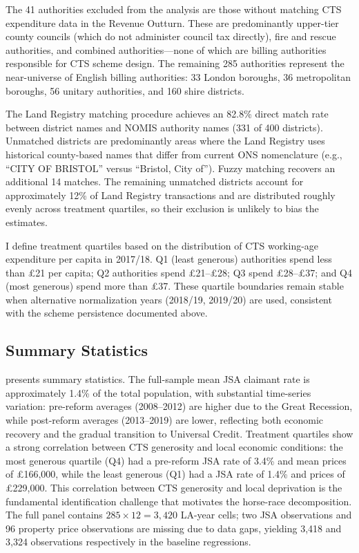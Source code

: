\documentclass[12pt]{article}
\begin{document}
The 41 authorities excluded from the analysis are those without matching CTS expenditure data in the Revenue Outturn. These are predominantly upper-tier county councils (which do not administer council tax directly), fire and rescue authorities, and combined authorities---none of which are billing authorities responsible for CTS scheme design. The remaining 285 authorities represent the near-universe of English billing authorities: 33 London boroughs, 36 metropolitan boroughs, 56 unitary authorities, and 160 shire districts.

The Land Registry matching procedure achieves an 82.8\% direct match rate between district names and NOMIS authority names (331 of 400 districts). Unmatched districts are predominantly areas where the Land Registry uses historical county-based names that differ from current ONS nomenclature (e.g., ``CITY OF BRISTOL'' versus ``Bristol, City of''). Fuzzy matching recovers an additional 14 matches. The remaining unmatched districts account for approximately 12\% of Land Registry transactions and are distributed roughly evenly across treatment quartiles, so their exclusion is unlikely to bias the estimates.

I define treatment quartiles based on the distribution of CTS working-age expenditure per capita in 2017/18. Q1 (least generous) authorities spend less than \pounds21 per capita; Q2 authorities spend \pounds21--\pounds28; Q3 spend \pounds28--\pounds37; and Q4 (most generous) spend more than \pounds37. These quartile boundaries remain stable when alternative normalization years (2018/19, 2019/20) are used, consistent with the scheme persistence documented above.

\subsection{Summary Statistics}



 presents summary statistics. The full-sample mean JSA claimant rate is approximately 1.4\% of the total population, with substantial time-series variation: pre-reform averages (2008--2012) are higher due to the Great Recession, while post-reform averages (2013--2019) are lower, reflecting both economic recovery and the gradual transition to Universal Credit. Treatment quartiles show a strong correlation between CTS generosity and local economic conditions: the most generous quartile (Q4) had a pre-reform JSA rate of 3.4\% and mean prices of \pounds166,000, while the least generous (Q1) had a JSA rate of 1.4\% and prices of \pounds229,000. This correlation between CTS generosity and local deprivation is the fundamental identification challenge that motivates the horse-race decomposition. The full panel contains $285 \times 12 = 3{,}420$ LA-year cells; two JSA observations and 96 property price observations are missing due to data gaps, yielding 3,418 and 3,324 observations respectively in the baseline regressions.
\end{document}
